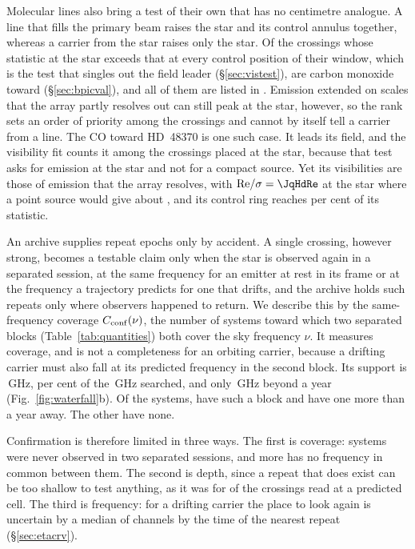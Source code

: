 Molecular lines also bring a test of their own that has no centimetre
analogue. A line that fills the primary beam raises the star and its control
annulus together, whereas a carrier from the star raises only the star. Of the \LrStageN{}
crossings whose statistic at the star exceeds that at every control position
of their window, which is the test that singles out the field leader
(\S\ref{sec:vistest}), \LrStageNCo{} are carbon monoxide toward
\LrStageCoStars{} (\S\ref{sec:bpicval}), and all of them are listed in
\texttt{\LrStageFile}. Emission extended on scales that the array partly
resolves out can still peak at the star, however, so the rank sets an order
of priority among the crossings and cannot by itself tell a carrier from a
line. The CO toward HD~48370 is one such case. It leads its field, and the visibility fit counts it among the
crossings placed at the star, because that test asks for emission at the
star and not for a compact source. Yet its visibilities are those of
emission that the array resolves, with
${\rm Re}/\sigma=\JqHdRe$ at the star where a point source would give about
\JqHdRePoint, and its control ring reaches \JqHdCtrlPct{} per cent of its
statistic.

An archive supplies repeat epochs only by accident. A single crossing,
however strong, becomes a testable claim only when the star is observed
again in a separated session, at the same frequency for an emitter at rest in
its frame or at the frequency a trajectory predicts for one that drifts, and
the archive holds such repeats only where observers happened to return.
We describe this by the same-frequency coverage
$C_{\rm conf}(\nu)$, the number of systems toward which two separated blocks
(Table~\ref{tab:quantities}) both cover the sky frequency $\nu$. It measures
coverage, and is not a completeness for an orbiting carrier, because a
drifting carrier must also fall at its predicted frequency in the second
block. Its support is \CvConfGHzDay\,GHz, \CvConfPctDay{} per cent of the
\CvUnionA\,GHz searched, and only \CvConfGHzYr\,GHz beyond a year
(Fig.~\ref{fig:waterfall}b). Of the \NSysClassA{} systems, \ZcConfSysDay{}
have such a block and \ZcConfSysYr{} have one more than a year away. The
other \ZcNoRepSys{} have none.

Confirmation is therefore limited in three ways. The first is coverage:
\ZcNoRepNoSep{} systems were never observed in two separated sessions, and
\ZcNoRepNoFreqWord{} more has no frequency in common between them. The
second is depth, since a repeat that does exist can be too shallow to test
anything, as it was for \HjNPowerLo{} of the \RcNExcl{} crossings read at a
predicted cell. The third is frequency: for a drifting carrier the place to
look again is uncertain by a median of \ZtRegChanMed{} channels by the time
of the nearest repeat (\S\ref{sec:etacrv}).


